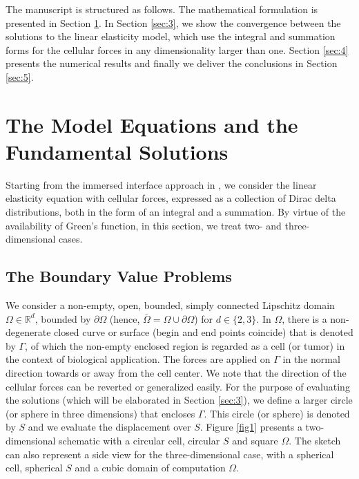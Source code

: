 \documentclass[pdflatex,sn-mathphys-num]{sn-jnl}
\newtheorem*{lemma star}{Lemma}
\renewcommand{\overline}{\bar}
\begin{document}
The manuscript is structured as follows. The mathematical formulation is presented in Section \ref{sec:2}. In Section \ref{sec:3}, we show the convergence between the solutions to the linear elasticity model, which use the integral and summation forms for the cellular forces in any dimensionality larger than one. Section \ref{sec:4} presents the numerical results and finally we deliver the conclusions in Section \ref{sec:5}.

\section{The Model Equations and the Fundamental Solutions}
\label{sec:2}

Starting from the immersed interface approach in \citet{Peng_2022_JCAM}, we consider the linear elasticity equation with cellular forces, expressed as a collection of Dirac delta distributions, both in the form of an integral and a summation. By virtue of the availability of Green's function, in this section, we treat two- and three-dimensional cases.


\subsection{The Boundary Value Problems}
We consider a non-empty, open, bounded, simply connected Lipschitz domain $\Omega \in \mathbb{R}^d$, bounded by $\partial\Omega$ (hence, $\overline{\Omega} = \Omega \cup \partial \Omega$) for $d \in \{2,3\}$. In $\Omega$, there is a non-degenerate closed curve or surface (begin and end points coincide) that is denoted by $\Gamma$, of which the non-empty enclosed region is regarded as a cell (or tumor) in the context of biological application. The forces are applied on $\Gamma$ in the normal direction towards or away from the cell center. We note that the direction of the cellular forces can be reverted or generalized easily. For the purpose of evaluating the solutions (which will be elaborated in Section \ref{sec:3}), we define a larger circle (or sphere in three dimensions) that encloses $\Gamma$. This circle (or sphere) is denoted by $S$ and we evaluate the displacement over $S$. Figure \ref{fig1} presents a two-dimensional schematic with a circular cell, circular $S$ and square $\Omega$. The sketch can also represent a side view for the three-dimensional case, with a spherical cell, spherical $S$ and a cubic domain of computation $\Omega$.
\end{document}
